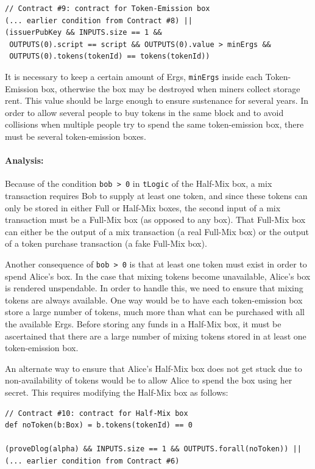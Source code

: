 \documentclass[runningheads]{llncs}
\begin{document}
{\small
\begin{Verbatim}[frame=single]
// Contract #9: contract for Token-Emission box
(... earlier condition from Contract #8) || 
(issuerPubKey && INPUTS.size == 1 && 
 OUTPUTS(0).script == script && OUTPUTS(0).value > minErgs &&
 OUTPUTS(0).tokens(tokenId) == tokens(tokenId))
\end{Verbatim}
}
It is necessary to keep a certain amount of Ergs, \texttt{minErgs} inside each Token-Emission box, otherwise the box may be destroyed when miners collect storage rent. This value should be large enough to ensure sustenance for several years. 
In order to allow several people to buy tokens in the same block and to avoid collisions when multiple people try to spend the same token-emission box, there must be several token-emission boxes. 

\paragraph{Analysis:} 
Because of the condition \texttt{bob > 0} in \texttt{tLogic} of the Half-Mix box, a mix transaction requires Bob to supply at least one token, and since these tokens can only be stored in either Full or Half-Mix boxes, the second input of a mix transaction must be a Full-Mix box (as opposed to any box).
That Full-Mix box can either be the output of a mix transaction (a real Full-Mix box) or the output of a token purchase transaction (a fake Full-Mix box).

Another consequence of \texttt{bob > 0} is that at least one token must exist in order to spend Alice's box. In the case that mixing tokens become unavailable, Alice's box is rendered unspendable. In order to handle this, we need to ensure that mixing tokens are always available. One way would be to have each token-emission box store a large number of tokens, much more than what can be purchased with all the available Ergs. Before storing any funds in a Half-Mix box, it must be ascertained that there are a large number of mixing tokens stored in at least one token-emission box. 

An alternate way to ensure that Alice's Half-Mix box does not get stuck due to non-availability of tokens would be to allow Alice to spend the box using her secret. This requires modifying the Half-Mix box as follows:

{\small
\begin{Verbatim}[frame=single]
// Contract #10: contract for Half-Mix box
def noToken(b:Box) = b.tokens(tokenId) == 0

(proveDlog(alpha) && INPUTS.size == 1 && OUTPUTS.forall(noToken)) || 
(... earlier condition from Contract #6)
\end{Verbatim}
}
\end{document}
